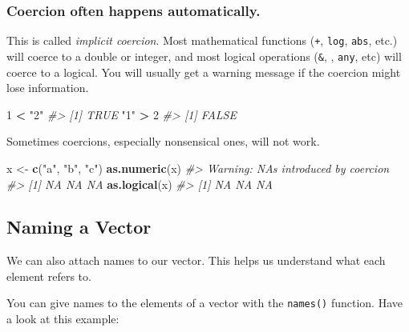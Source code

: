 \documentclass[]{book}
\newenvironment{Shaded}{\begin{snugshade}}{\end{snugshade}}
\newcommand{\KeywordTok}[1]{\textcolor[rgb]{0.13,0.29,0.53}{\textbf{#1}}}
\newcommand{\DecValTok}[1]{\textcolor[rgb]{0.00,0.00,0.81}{#1}}
\newcommand{\StringTok}[1]{\textcolor[rgb]{0.31,0.60,0.02}{#1}}
\newcommand{\CommentTok}[1]{\textcolor[rgb]{0.56,0.35,0.01}{\textit{#1}}}
\newcommand{\OperatorTok}[1]{\textcolor[rgb]{0.81,0.36,0.00}{\textbf{#1}}}
\newcommand{\NormalTok}[1]{#1}
\begin{document}
\subsubsection*{Coercion often happens
automatically.}\label{coercion-often-happens-automatically.}

This is called \emph{implicit coercion}. Most mathematical functions
(\texttt{+}, \texttt{log}, \texttt{abs}, etc.) will coerce to a double
or integer, and most logical operations (\texttt{\&},
\texttt{\textbar{}}, \texttt{any}, etc) will coerce to a logical. You
will usually get a warning message if the coercion might lose
information.

\begin{Shaded}
\begin{Highlighting}[]
\DecValTok{1} \OperatorTok{<}\StringTok{ "2"}
\CommentTok{#> [1] TRUE}
\StringTok{"1"} \OperatorTok{>}\StringTok{ }\DecValTok{2}
\CommentTok{#> [1] FALSE}
\end{Highlighting}
\end{Shaded}

Sometimes coercions, especially nonsensical ones, will not work.

\begin{Shaded}
\begin{Highlighting}[]
\NormalTok{x <-}\StringTok{ }\KeywordTok{c}\NormalTok{(}\StringTok{"a"}\NormalTok{, }\StringTok{"b"}\NormalTok{, }\StringTok{"c"}\NormalTok{)}
\KeywordTok{as.numeric}\NormalTok{(x)}
\CommentTok{#> Warning: NAs introduced by coercion}
\CommentTok{#> [1] NA NA NA}
\KeywordTok{as.logical}\NormalTok{(x)}
\CommentTok{#> [1] NA NA NA}
\end{Highlighting}
\end{Shaded}

\subsection{Naming a Vector}\label{naming-a-vector}

We can also attach names to our vector. This helps us understand what
each element refers to.

You can give names to the elements of a vector with the \texttt{names()}
function. Have a look at this example:
\end{document}
